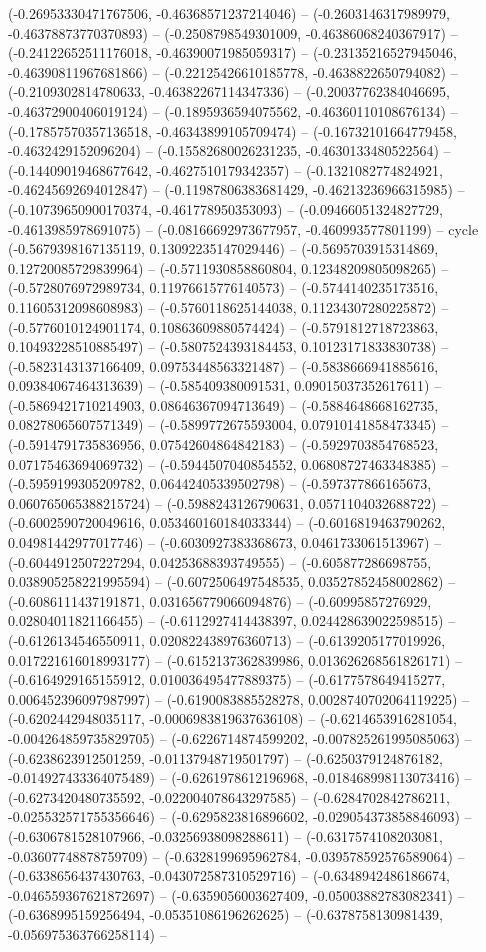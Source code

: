 (-0.26953330471767506, -0.46368571237214046) -- (-0.2603146317989979, -0.46378873770370893) -- (-0.2508798549301009, -0.46386068240367917) -- (-0.24122652511176018, -0.46390071985059317) -- (-0.23135216527945046, -0.46390811967681866) -- (-0.22125426610185778, -0.4638822650794082) -- (-0.2109302814780633, -0.46382267114347336) -- (-0.20037762384046695, -0.46372900406019124) -- (-0.1895936594075562, -0.46360110108676134) -- (-0.17857570357136518, -0.46343899105709474) -- (-0.16732101664779458, -0.4632429152096204) -- (-0.15582680026231235, -0.4630133480522564) -- (-0.14409019468677642, -0.4627510179342357) -- (-0.1321082774824921, -0.46245692694012847) -- (-0.11987806383681429, -0.46213236966315985) -- (-0.10739650900170374, -0.461778950353093) -- (-0.09466051324827729, -0.4613985978691075) -- (-0.08166692973677957, -0.460993577801199) -- cycle
	(-0.5679398167135119, 0.13092235147029446) -- (-0.5695703915314869, 0.12720085729839964) -- (-0.5711930858860804, 0.12348209805098265) -- (-0.5728076972989734, 0.11976615776140573) -- (-0.5744140235173516, 0.11605312098608983) -- (-0.5760118625144038, 0.11234307280225872) -- (-0.5776010124901174, 0.10863609880574424) -- (-0.5791812718723863, 0.10493228510885497) -- (-0.5807524393184453, 0.10123171833830738) -- (-0.5823143137166409, 0.09753448563321487) -- (-0.5838666941885616, 0.09384067464313639) -- (-0.585409380091531, 0.09015037352617611) -- (-0.5869421710214903, 0.08646367094713649) -- (-0.5884648668162735, 0.08278065607571349) -- (-0.5899772675593004, 0.07910141858473345) -- (-0.5914791735836956, 0.07542604864842183) -- (-0.5929703854768523, 0.07175463694069732) -- (-0.5944507040854552, 0.06808727463348385) -- (-0.5959199305209782, 0.06442405339502798) -- (-0.597377866165673, 0.060765065388215724) -- (-0.5988243126790631, 0.0571104032688722) -- (-0.6002590720049616, 0.053460160184033344) -- (-0.6016819463790262, 0.04981442977017746) -- (-0.6030927383368673, 0.0461733061513967) -- (-0.6044912507227294, 0.04253688393749555) -- (-0.605877286698755, 0.038905258221995594) -- (-0.6072506497548535, 0.03527852458002862) -- (-0.6086111437191871, 0.031656779066094876) -- (-0.60995857276929, 0.02804011821166455) -- (-0.6112927414438397, 0.024428639022598515) -- (-0.6126134546550911, 0.020822438976360713) -- (-0.6139205177019926, 0.017221616018993177) -- (-0.6152137362839986, 0.013626268561826171) -- (-0.6164929165155912, 0.010036495477889375) -- (-0.6177578649415277, 0.006452396097987997) -- (-0.6190083885528278, 0.0028740702064119225) -- (-0.6202442948035117, -0.0006983819637636108) -- (-0.6214653916281054, -0.004264859735829705) -- (-0.6226714874599202, -0.007825261995085063) -- (-0.6238623912501259, -0.01137948719501797) -- (-0.6250379124876182, -0.014927433364075489) -- (-0.6261978612196968, -0.018468998113073416) -- (-0.6273420480735592, -0.022004078643297585) -- (-0.6284702842786211, -0.025532571755356646) -- (-0.6295823816896602, -0.029054373858846093) -- (-0.6306781528107966, -0.03256938098288611) -- (-0.6317574108203081, -0.03607748878759709) -- (-0.6328199695962784, -0.039578592576589064) -- (-0.6338656437430763, -0.043072587310529716) -- (-0.6348942486186674, -0.046559367621872697) -- (-0.6359056003627409, -0.05003882783082341) -- (-0.6368995159256494, -0.05351086196262625) -- (-0.6378758130981439, -0.056975363766258114) -- 